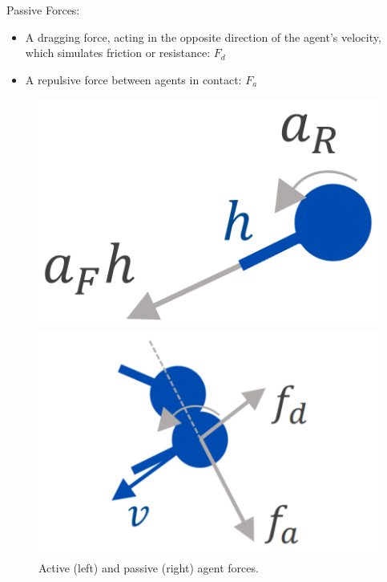 \documentclass[9pt]{IEEEtran}
\begin{document}
Passive Forces:
\begin{itemize}
    \item A dragging force, acting in the opposite direction of the agent's velocity, which simulates friction or resistance: $F_d$
    \item A repulsive force between agents in contact: $F_a$
\end{itemize}

\begin{figure}[h]
    \centering
    \begin{minipage}{0.20\textwidth}
        \centering
        \includegraphics[width=\textwidth]{agent_active.png}
    \end{minipage}
    \begin{minipage}{0.25\textwidth}
        \centering
        \includegraphics[width=\textwidth]{agent_passive.png}
    \end{minipage}
    \caption{Active (left) and passive (right) agent forces. \cite{li2023predator}}
    \label{fig:main_figure}
\end{figure}
\end{document}
